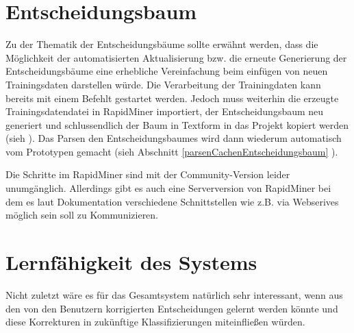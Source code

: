 \section{Entscheidungsbaum}
Zu der Thematik der Entscheidungsbäume sollte erwähnt werden, dass die Möglichkeit der automatisierten Aktualisierung bzw. die erneute Generierung der Entscheidungsbäume eine erhebliche Vereinfachung beim einfügen von neuen Trainingsdaten darstellen würde. Die Verarbeitung der Trainingdaten kann bereits mit einem Befehlt gestartet werden. Jedoch muss weiterhin die erzeugte Trainingsdatendatei in RapidMiner importiert, der Entscheidungsbaum neu generiert und schlussendlich der Baum in Textform in das Projekt kopiert werden (sieh ). Das Parsen den Entscheidungsbaumes wird dann wiederum automatisch vom Prototypen gemacht (sieh Abschnitt \ref{parsenCachenEntscheidungsbaum} ). 

Die Schritte im RapidMiner sind mit der Community-Version leider unumgänglich. Allerdings gibt es auch eine Serverversion von RapidMiner bei dem es laut Dokumentation verschiedene Schnittstellen wie z.B. via Webserives möglich sein soll zu Kommunizieren. 

\section{Lernfähigkeit des Systems}
Nicht zuletzt wäre es für das Gesamtsystem natürlich sehr interessant, wenn aus den von den Benutzern korrigierten Entscheidungen gelernt werden könnte und diese Korrekturen in zukünftige Klassifizierungen miteinfließen würden. 
